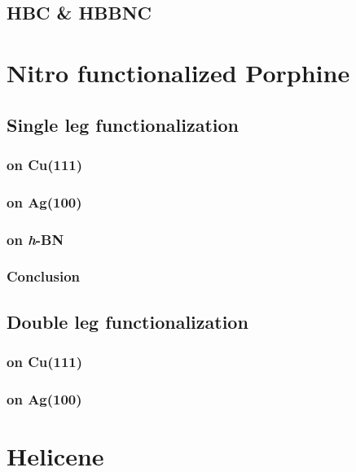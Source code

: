 \documentclass[
10pt,					%
a4paper,				%
twoside,				%
BCOR=8mm,				%
headings=normal,		%
headsepline,			%
footsepline,			%
plainfootsepline,		%
]{scrbook}
\begin{document}
\section{HBC \& HBBNC}

\chapter{Nitro functionalized Porphine}
    
  \section{Single leg functionalization}
   \subsection{on Cu(111)}
      
   \subsection{on Ag(100)}
      
   \subsection{on \textit{h}-BN}
      
	\subsection{Conclusion}
      

  \section{Double leg functionalization}
   \subsection{on Cu(111)}
      
   \subsection{on Ag(100)}
      
\chapter{Helicene}
\end{document}
